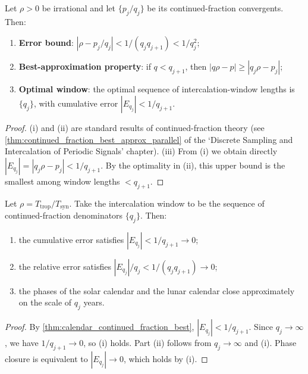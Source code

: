 \begin{theorem}\label{thm:calendar_continued_fraction_best}
Let \(\rho>0\) be irrational and let \(\{p_j/q_j\}\) be its continued-fraction convergents. Then:
\begin{enumerate}[label=(\roman*)]
    \item \textbf{Error bound}: \(|\rho-p_j/q_j|<1/(q_jq_{j+1})<1/q_j^2\);
    \item \textbf{Best-approximation property}: if \(q<q_{j+1}\), then \(|q\rho-p|\ge|q_j\rho-p_j|\);
    \item \textbf{Optimal window}: the optimal sequence of intercalation-window lengths is \(\{q_j\}\), with cumulative error \(|E_{q_j}|<1/q_{j+1}\).
\end{enumerate}
\end{theorem}

\begin{proof}
(i) and (ii) are standard results of continued-fraction theory (see \cref{thm:continued_fraction_best_approx_parallel} of the `Discrete Sampling and Intercalation of Periodic Signals' chapter).
(iii) From (i) we obtain directly \(|E_{q_j}|=|q_j\rho-p_j|<1/q_{j+1}\). By the optimality in (ii), this upper bound is the smallest among window lengths \(<q_{j+1}\).
\end{proof}

\begin{theorem}\label{thm:calendar_intercalation_convergence}
Let \(\rho=T_{\text{trop}}/T_{\text{syn}}\). Take the intercalation window to be the sequence of continued-fraction denominators \(\{q_j\}\). Then:
\begin{enumerate}[label=(\roman*)]
    \item the cumulative error satisfies \(|E_{q_j}|<1/q_{j+1}\to 0\);
    \item the relative error satisfies \(|E_{q_j}|/q_j<1/(q_jq_{j+1})\to 0\);
    \item the phases of the solar calendar and the lunar calendar close approximately on the scale of \(q_j\) years.
\end{enumerate}
\end{theorem}

\begin{proof}
By \cref{thm:calendar_continued_fraction_best}, \(|E_{q_j}|<1/q_{j+1}\). Since \(q_j\to\infty\), we have \(1/q_{j+1}\to 0\), so (i) holds. Part (ii) follows from \(q_j\to\infty\) and (i). Phase closure is equivalent to \(|E_{q_j}|\to 0\), which holds by (i).
\end{proof}

